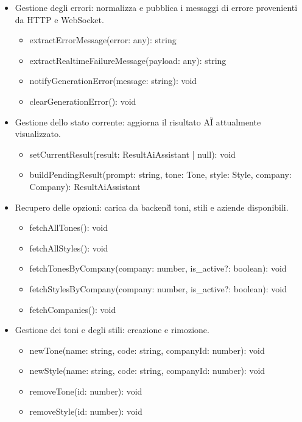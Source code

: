 \documentclass[a4paper,11pt]{article}
\begin{document}
\begin{itemize}[noitemsep, topsep=0pt]
  \item Gestione degli errori: normalizza e pubblica i messaggi di errore provenienti da HTTP e WebSocket.
  \begin{itemize}[noitemsep, topsep=0pt]
    \item extractErrorMessage(error: any): string
    \item extractRealtimeFailureMessage(payload: any): string
    \item notifyGenerationError(message: string): void
    \item clearGenerationError(): void
  \end{itemize}

  \item Gestione dello stato corrente: aggiorna il risultato AI\G{} attualmente visualizzato.
  \begin{itemize}[noitemsep, topsep=0pt]
    \item setCurrentResult(result: ResultAiAssistant | null): void
    \item buildPendingResult(prompt: string, tone: Tone, style: Style, company: Company): ResultAiAssistant
  \end{itemize}

  \item Recupero delle opzioni: carica da backend\G{} toni, stili e aziende disponibili.
  \begin{itemize}[noitemsep, topsep=0pt]
    \item fetchAllTones(): void
    \item fetchAllStyles(): void
    \item fetchTonesByCompany(company: number, is_active?: boolean): void
    \item fetchStylesByCompany(company: number, is_active?: boolean): void
    \item fetchCompanies(): void
  \end{itemize}

  \item Gestione dei toni e degli stili: creazione e rimozione.
  \begin{itemize}[noitemsep, topsep=0pt]
    \item newTone(name: string, code: string, companyId: number): void
    \item newStyle(name: string, code: string, companyId: number): void
    \item removeTone(id: number): void
    \item removeStyle(id: number): void
  \end{itemize}


\end{itemize}
\end{document}
